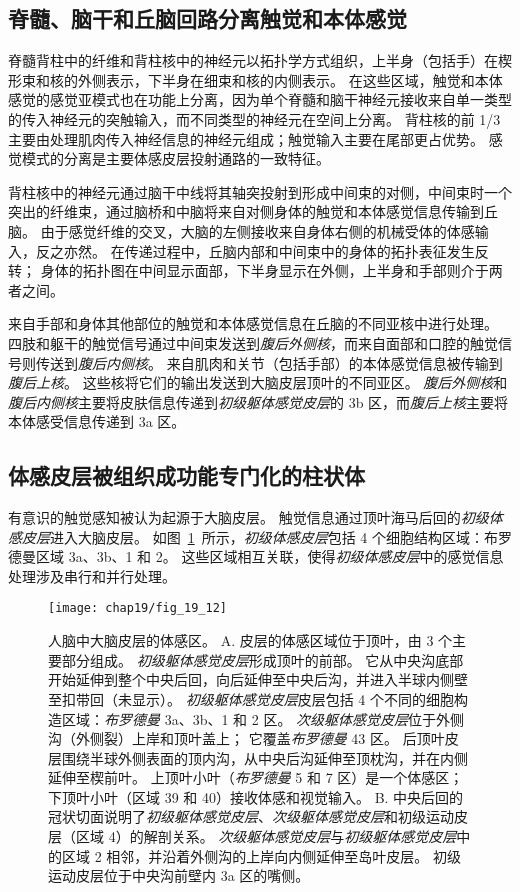 \subsection{脊髓、脑干和丘脑回路分离触觉和本体感觉}

脊髓背柱中的纤维和背柱核中的神经元以拓扑学方式组织，上半身（包括手）在楔形束和核的外侧表示，下半身在细束和核的内侧表示。
在这些区域，触觉和本体感觉的感觉亚模式也在功能上分离，因为单个脊髓和脑干神经元接收来自单一类型的传入神经元的突触输入，而不同类型的神经元在空间上分离。 
背柱核的前 1/3 主要由处理肌肉传入神经信息的神经元组成；触觉输入主要在尾部更占优势。
感觉模式的分离是主要体感皮层投射通路的一致特征。


背柱核中的神经元通过脑干中线将其轴突投射到形成中间束的对侧，中间束时一个突出的纤维束，通过脑桥和中脑将来自对侧身体的触觉和本体感觉信息传输到丘脑。
由于感觉纤维的交叉，大脑的左侧接收来自身体右侧的机械受体的体感输入，反之亦然。
在传递过程中，丘脑内部和中间束中的身体的拓扑表征发生反转；
身体的拓扑图在中间显示面部，下半身显示在外侧，上半身和手部则介于两者之间。


来自手部和身体其他部位的触觉和本体感觉信息在丘脑的不同亚核中进行处理。
四肢和躯干的触觉信号通过中间束发送到\textit{腹后外侧核}，而来自面部和口腔的触觉信号则传送到\textit{腹后内侧核}。
来自肌肉和关节（包括手部）的本体感觉信息被传输到\textit{腹后上核}。
这些核将它们的输出发送到大脑皮层顶叶的不同亚区。 
\textit{腹后外侧核}和\textit{腹后内侧核}主要将皮肤信息传递到\textit{初级躯体感觉皮层}的 3b 区，而\textit{腹后上核}主要将本体感受信息传递到 3a 区。



\subsection{体感皮层被组织成功能专门化的柱状体}

有意识的触觉感知被认为起源于大脑皮层。
触觉信息通过顶叶海马后回的\textit{初级体感皮层}进入大脑皮层。
如图~\ref{fig:19_12}~所示，\textit{初级体感皮层}包括 4 个细胞结构区域：布罗德曼区域 3a、3b、1 和 2。
这些区域相互关联，使得\textit{初级体感皮层}中的感觉信息处理涉及串行和并行处理。


\begin{figure}[htbp]
	\centering
	\texttt{[image: chap19/fig\_19\_12]}
	\caption{人脑中大脑皮层的体感区。
		A. 皮层的体感区域位于顶叶，由 3 个主要部分组成。
		\textit{初级躯体感觉皮层}形成顶叶的前部。
		它从中央沟底部开始延伸到整个中央后回，向后延伸至中央后沟，并进入半球内侧壁至扣带回（未显示）。
		\textit{初级躯体感觉皮层}皮层包括 4 个不同的细胞构造区域：\textit{布罗德曼} 3a、3b、1 和 2 区。
		\textit{次级躯体感觉皮层}位于外侧沟（外侧裂）上岸和顶叶盖上；
		它覆盖\textit{布罗德曼} 43 区。
		后顶叶皮层围绕半球外侧表面的顶内沟，从中央后沟延伸至顶枕沟，并在内侧延伸至楔前叶。
		上顶叶小叶（\textit{布罗德曼}  5 和 7 区）是一个体感区；
		下顶叶小叶（区域 39 和 40）接收体感和视觉输入。
		B. 中央后回的冠状切面说明了\textit{初级躯体感觉皮层}、\textit{次级躯体感觉皮层}和初级运动皮层（区域 4）的解剖关系。
		\textit{次级躯体感觉皮层}与\textit{初级躯体感觉皮层}中的区域 2 相邻，并沿着外侧沟的上岸向内侧延伸至岛叶皮层。
		初级运动皮层位于中央沟前壁内 3a 区的嘴侧。}
	\label{fig:19_12}
\end{figure}


